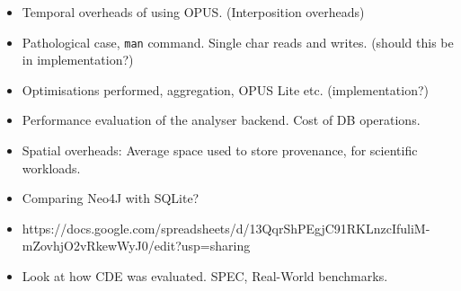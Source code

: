 \documentclass[withindex,glossary]{cam-thesis}
\begin{document}









\begin{itemize}
\item Temporal overheads of using OPUS. (Interposition overheads)
\item Pathological case, \texttt{man} command. Single char reads and writes. (should this be in implementation?)
\item Optimisations performed, aggregation, OPUS Lite etc. (implementation?)
\item Performance evaluation of the analyser backend. Cost of DB operations.
\item Spatial overheads: Average space used to store provenance, for scientific workloads.
\item Comparing Neo4J with SQLite?
\item https://docs.google.com/spreadsheets/d/13QqrShPEgjC91RKLnzcIfuliM-mZovhjO2vRkewWyJ0/edit?usp=sharing
\item Look at how CDE was evaluated. SPEC, Real-World benchmarks.
\end{itemize}
\end{document}

